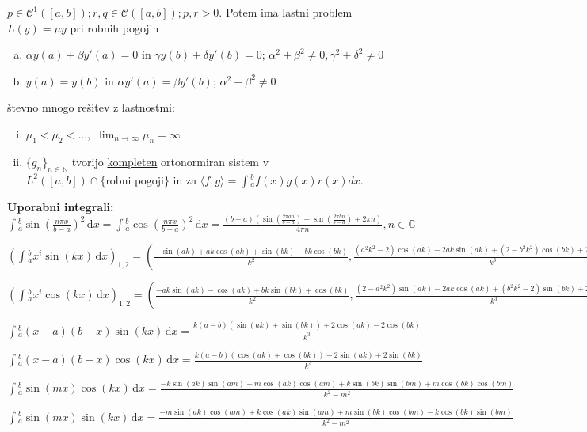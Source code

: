 \documentclass[10pt,a4paper]{amsart}
\theoremstyle{definition} %
\theoremstyle{plain} %
\newcommand{\dx}{\ensuremath{\,\mathrm{d}x}}
\let\oldint\int
\renewcommand{\int}{\oldint \!}
\newcommand{\N}{\mathbb N}
\newcommand{\C}{\mathbb C}
\begin{document}
$p \in \mathcal{C}^1([a,b]); r,q \in \mathcal{C}([a,b]); p,r > 0$. Potem ima lastni problem $L(y) = \mu y$ pri robnih pogojih
\vspace{-0.2cm}
\begin{enumerate}[a)]
\item $\alpha y(a) + \beta y'(a) = 0$ in $\gamma y(b) +  \delta y'(b) = 0$; $\alpha^2 + \beta^2 \neq 0, \gamma^2 + \delta^2 \neq 0$
\item $y(a) = y(b)$ in $\alpha y'(a) = \beta y'(b)$; $\alpha^2+\beta^2 \neq 0$
\end{enumerate}
števno mnogo rešitev z lastnostmi:
\begin{enumerate}[i)]
\item $\mu_1 < \mu_2 < \ldots, $ $\lim_{n\rightarrow \infty}\mu_n = \infty$
\item $\{g_n\}_{n\in \N}$ tvorijo \underline{kompleten} ortonormiran sistem v $L^2([a,b])\cap \{\text{robni pogoji}\}$ in za $ \langle f,g \rangle = \int_a^b f(x)g(x)r(x)dx$.
\end{enumerate}

\textbf{Uporabni integrali:}
$\int_a^b \sin(\frac{n\pi x}{b-a})^2 \dx = \int_a^b \cos(\frac{n\pi x}{b-a})^2 \dx =
\frac{(b-a) \left(\sin \left(\frac{2 \pi  a n}{b-a}\right)-\sin \left(\frac{2
\pi  b n}{b-a}\right)+2 \pi  n\right)}{4 \pi  n}, n \in \C$

$(\int_a^bx^i \sin(kx)\dx)_{1,2} = (\frac{-\sin (a k)+a k \cos (a k)+\sin (b k)-b k \cos (b k)}{k^2},\frac{(a^2 k^2-2) \cos (a k)-2 a k \sin (a k)+(2-b^2 k^2) \cos (b k)+2 b k \sin (b k)}{k^3})$

$(\int_a^bx^i \cos(kx)\dx)_{1,2} = (\frac{-a k \sin (a k)-\cos (a k)+b k \sin (b k)+\cos (b k)}{k^2},\frac{(2-a^2 k^2) \sin (a k)-2 a k \cos (a k)+(b^2 k^2-2) \sin (b k)+2 b k \cos (b k)}{k^3})$

$\int_a^b (x-a)(b-x)\sin(kx)\dx = \frac{k (a-b) (\sin (a k)+\sin (b k))+2 \cos (a k)-2 \cos (b k)}{k^3}$

$\int_a^b (x-a)(b-x)\cos(kx)\dx = \frac{k (a-b) (\cos (a k)+\cos (b k))-2 \sin (a k)+2 \sin (b k)}{k^3}$

$\int_a^b \sin(mx)\cos(kx)\dx = \frac{-k \sin (a k) \sin (a m)-m \cos (a k) \cos (a m)+k \sin (b k) \sin (b m)+m \cos (b k) \cos (b m)}{k^2-m^2}$

$\int_a^b \sin(mx)\sin(kx)\dx = \frac{-m \sin (a k) \cos (a m)+k \cos (a k) \sin (a m)+m \sin (b k) \cos (b m)-k \cos (b k) \sin (b m)}{k^2-m^2}$
\end{document}
